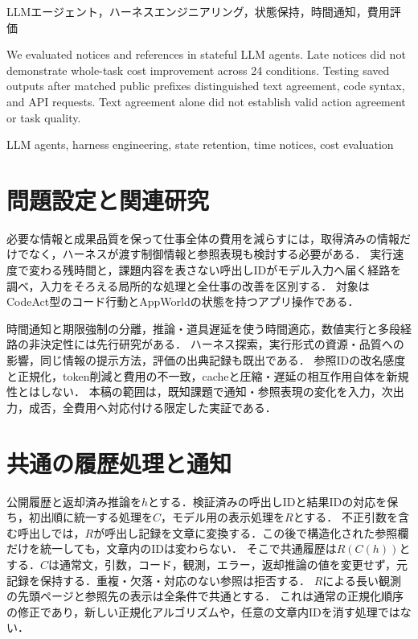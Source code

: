 \documentclass[letter]{ieicej}
\begin{document}
\maketitle
\begin{abstract}
状態保持型LLMエージェントの通知と参照表現を評価した. 既知４課題24条件で全仕事費用の改善は示せなかった. 保存18出力の実行検査では，公開出力，コード構文，API要求の一致を区別する必要が確認された.
\end{abstract}
\begin{keyword}LLMエージェント，ハーネスエンジニアリング，状態保持，時間通知，費用評価\end{keyword}
\begin{eabstract}
We evaluated notices and references in stateful LLM agents. Late notices did not demonstrate whole-task cost improvement across 24 conditions. Testing saved outputs after matched public prefixes distinguished text agreement, code syntax, and API requests. Text agreement alone did not establish valid action agreement or task quality.
\end{eabstract}
\begin{ekeyword}LLM agents, harness engineering, state retention, time notices, cost evaluation\end{ekeyword}
\section{問題設定と関連研究}
必要な情報と成果品質を保って仕事全体の費用を減らすには，取得済みの情報だけでなく，ハーネスが渡す制御情報と参照表現も検討する必要がある．
実行速度で変わる残時間と，課題内容を表さない呼出しIDがモデル入力へ届く経路を調べ，入力をそろえる局所的な処理と全仕事の改善を区別する．
対象はCodeAct\cite{codeact}型のコード行動とAppWorld\cite{appworld}の状態を持つアプリ操作である．

時間通知と期限強制の分離\cite{clock}，推論・道具遅延を使う時間適応\cite{timely}，数値実行と多段経路の非決定性\cite{nondeterminism,consistency}には先行研究がある．
ハーネス探索\cite{beyondprompts}，実行形式の資源・品質への影響\cite{localprotocol}，同じ情報の提示方法\cite{delivery}，評価の出典記録\cite{repro}も既出である．
参照IDの改名感度と正規化\cite{canonical}，token削減と費用の不一致\cite{costproxy}，cacheと圧縮・遅延の相互作用\cite{capc,cacheeval}自体を新規性とはしない．
本稿の範囲は，既知課題で通知・参照表現の変化を入力，次出力，成否，全費用へ対応付ける限定した実証である．

\section{共通の履歴処理と通知}
公開履歴と返却済み推論を$h$とする．検証済みの呼出しIDと結果IDの対応を保ち，初出順に統一する処理を$C$，モデル用の表示処理を$R$とする．
不正引数を含む呼出しでは，$R$が呼出し記録を文章に変換する．この後で構造化された参照欄だけを統一しても，文章内のIDは変わらない．
そこで共通履歴は$R(C(h))$とする．$C$は通常文，引数，コード，観測，エラー，返却推論の値を変更せず，元記録を保持する．重複・欠落・対応のない参照は拒否する．
$R$による長い観測の先頭ページと参照先の表示は全条件で共通とする．
これは通常の正規化順序の修正であり，新しい正規化アルゴリズムや，任意の文章内IDを消す処理ではない．
\end{document}
